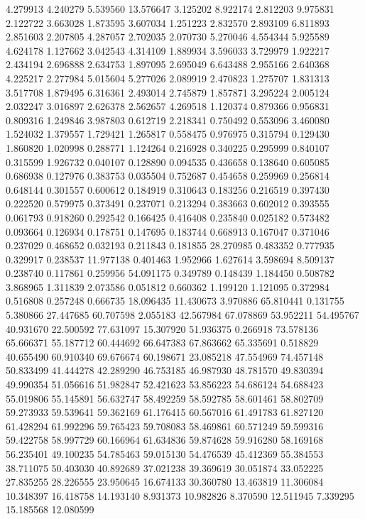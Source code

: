 4.279913
4.240279
5.539560
13.576647
3.125202
8.922174
2.812203
9.975831
2.122722
3.663028
1.873595
3.607034
1.251223
2.832570
2.893109
6.811893
2.851603
2.207805
4.287057
2.702035
2.070730
5.270046
4.554344
5.925589
4.624178
1.127662
3.042543
4.314109
1.889934
3.596033
3.729979
1.922217
2.434194
2.696888
2.634753
1.897095
2.695049
6.643488
2.955166
2.640368
4.225217
2.277984
5.015604
5.277026
2.089919
2.470823
1.275707
1.831313
3.517708
1.879495
6.316361
2.493014
2.745879
1.857871
3.295224
2.005124
2.032247
3.016897
2.626378
2.562657
4.269518
1.120374
0.879366
0.956831
0.809316
1.249846
3.987803
0.612719
2.218341
0.750492
0.553096
3.460080
1.524032
1.379557
1.729421
1.265817
0.558475
0.976975
0.315794
0.129430
1.860820
1.020998
0.288771
1.124264
0.216928
0.340225
0.295999
0.840107
0.315599
1.926732
0.040107
0.128890
0.094535
0.436658
0.138640
0.605085
0.686938
0.127976
0.383753
0.035504
0.752687
0.454658
0.259969
0.256814
0.648144
0.301557
0.600612
0.184919
0.310643
0.183256
0.216519
0.397430
0.222520
0.579975
0.373491
0.237071
0.213294
0.383663
0.602012
0.393555
0.061793
0.918260
0.292542
0.166425
0.416408
0.235840
0.025182
0.573482
0.093664
0.126934
0.178751
0.147695
0.183744
0.668913
0.167047
0.371046
0.237029
0.468652
0.032193
0.211843
0.181855
28.270985
0.483352
0.777935
0.329917
0.238537
11.977138
0.401463
1.952966
1.627614
3.598694
8.509137
0.238740
0.117861
0.259956
54.091175
0.349789
0.148439
1.184450
0.508782
3.868965
1.311839
2.073586
0.051812
0.660362
1.199120
1.121095
0.372984
0.516808
0.257248
0.666735
18.096435
11.430673
3.970886
65.810441
0.131755
5.380866
27.447685
60.707598
2.055183
42.567984
67.078869
53.952211
54.495767
40.931670
22.500592
77.631097
15.307920
51.936375
0.266918
73.578136
65.666371
55.187712
60.444692
66.647383
67.863662
65.335691
0.518829
40.655490
60.910340
69.676674
60.198671
23.085218
47.554969
74.457148
50.833499
41.444278
42.289290
46.753185
46.987930
48.781570
49.830394
49.990354
51.056616
51.982847
52.421623
53.856223
54.686124
54.688423
55.019806
55.145891
56.632747
58.492259
58.592785
58.601461
58.802709
59.273933
59.539641
59.362169
61.176415
60.567016
61.491783
61.827120
61.428294
61.992296
59.765423
59.708083
58.469861
60.571249
59.599316
59.422758
58.997729
60.166964
61.634836
59.874628
59.916280
58.169168
56.235401
49.100235
54.785463
59.015130
54.476539
45.412369
55.384553
38.711075
50.403030
40.892689
37.021238
39.369619
30.051874
33.052225
27.835255
28.226555
23.950645
16.674133
30.360780
13.463819
11.306084
10.348397
16.418758
14.193140
8.931373
10.982826
8.370590
12.511945
7.339295
15.185568
12.080599
